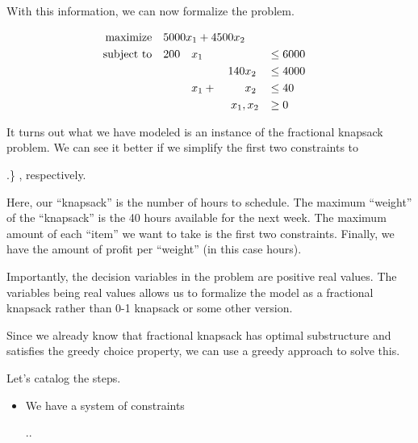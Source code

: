 \documentclass[12pt,letterpaper]{article}
\begin{document}
\begin{enumerate}
      With this information, we can now formalize the problem.

      \begin{alignat*}{7}
        \text{maximize}   \quad \rlap{$5000 x_1 + 4500 x_2$}                              \\
        \text{subject to} \quad & 200 & x_1 &       &     &                   && \leq 6000 \\
                                &     &     &       & 140 & x_2               && \leq 4000 \\
                                &     & x_1 & {}+{} &     & x_2               && \leq 40   \\
                                &     &     &       &     & \clap{$x_1, x_2$} && \geq 0    \\
      \end{alignat*}

      It turns out what we have modeled is an instance of the fractional knapsack problem.
      We can see it better if we simplify the first two constraints to

      \sysdelim.\}
      , respectively.

      Here, our ``knapsack'' is the number of hours to schedule.
      The maximum ``weight'' of the ``knapsack'' is the 40 hours available for the next week.
      The maximum amount of each ``item'' we want to take is the first two constraints.
      Finally, we have the amount of profit per ``weight'' (in this case hours).

      Importantly, the decision variables in the problem are positive real values.
      The variables being real values allows us to formalize the model as a fractional knapsack rather than 0-1 knapsack or some other version.

      Since we already know that fractional knapsack has optimal substructure and
      satisfies the greedy choice property,
      we can use a greedy approach to solve this.

      Let's catalog the steps.

      \begin{itemize}
        \item
          We have a system of constraints

          \sysdelim..


\end{itemize}
\end{enumerate}
\end{document}
